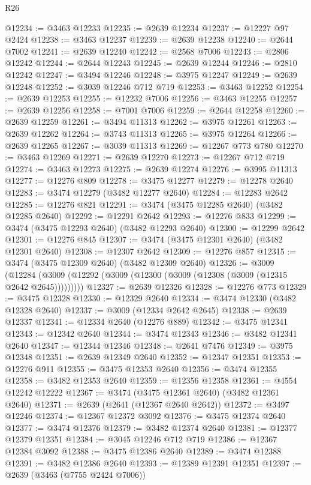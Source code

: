 \begin{lexlean}{R26}
\begin{coremodule}
@12234 := @3463 @12233
@12235 := @2639 @12234
@12237 := @12227 @97 @2424
@12238 := @3463 @12237
@12239 := @2639 @12238
@12240 := @2644 @7002
@12241 := @2639 @12240
@12242 := @2568 @7006
@12243 := @2806 @12242
@12244 := @2644 @12243
@12245 := @2639 @12244
@12246 := @2810 @12242
@12247 := @3494 @12246
@12248 := @3975 @12247
@12249 := @2639 @12248
@12252 := @3039 @12246 @712 @719
@12253 := @3463 @12252
@12254 := @2639 @12253
@12255 := @12232 @7006
@12256 := @3463 @12255
@12257 := @2639 @12256
@12258 := @7001 @7006
@12259 := @2644 @12258
@12260 := @2639 @12259
@12261 := @3494 @11313
@12262 := @3975 @12261
@12263 := @2639 @12262
@12264 := @3743 @11313
@12265 := @3975 @12264
@12266 := @2639 @12265
@12267 := @3039 @11313
@12269 := @12267 @773 @780
@12270 := @3463 @12269
@12271 := @2639 @12270
@12273 := @12267 @712 @719
@12274 := @3463 @12273
@12275 := @2639 @12274
@12276 := @3995 @11313
@12277 := @12276 @809
@12278 := @3475 @12277
@12279 := @12278 @2640
@12283 := @3474 @12279 (@3482 @12277 @2640)
@12284 := @12283 @2642
@12285 := @12276 @821
@12291 := @3474 (@3475 @12285 @2640) (@3482 @12285 @2640)
@12292 := @12291 @2642
@12293 := @12276 @833
@12299 := @3474 (@3475 @12293 @2640) (@3482 @12293 @2640)
@12300 := @12299 @2642
@12301 := @12276 @845
@12307 := @3474 (@3475 @12301 @2640) (@3482 @12301 @2640)
@12308 := @12307 @2642
@12309 := @12276 @857
@12315 := @3474 (@3475 @12309 @2640) (@3482 @12309 @2640)
@12326 := @3009
    (@12284 (@3009 (@12292 (@3009 (@12300 (@3009 (@12308 (@3009 (@12315 @2642 @2645)))))))))
@12327 := @2639 @12326
@12328 := @12276 @773
@12329 := @3475 @12328
@12330 := @12329 @2640
@12334 := @3474 @12330 (@3482 @12328 @2640)
@12337 := @3009 (@12334 @2642 @2645)
@12338 := @2639 @12337
@12341 := @12334 @2640 (@12276 @889)
@12342 := @3475 @12341
@12343 := @12342 @2640
@12344 := @3474 @12343
@12346 := @3482 @12341 @2640
@12347 := @12344 @12346
@12348 := @2641 @7476
@12349 := @3975 @12348
@12351 := @2639 @12349 @2640
@12352 := @12347 @12351
@12353 := @12276 @911
@12355 := @3475 @12353 @2640
@12356 := @3474 @12355
@12358 := @3482 @12353 @2640
@12359 := @12356 @12358
@12361 := @4554 @12242 @12222
@12367 := @3474 (@3475 @12361 @2640) (@3482 @12361 @2640)
@12371 := @2639 (@2641 (@12367 @2640 @2642))
@12372 := @3497 @12246
@12374 := @12367 @12372 @3092
@12376 := @3475 @12374 @2640
@12377 := @3474 @12376
@12379 := @3482 @12374 @2640
@12381 := @12377 @12379 @12351
@12384 := @3045 @12246 @712 @719
@12386 := @12367 @12384 @3092
@12388 := @3475 @12386 @2640
@12389 := @3474 @12388
@12391 := @3482 @12386 @2640
@12393 := @12389 @12391 @12351
@12397 := @2639 (@3463 (@7755 @2424 @7006))

\end{coremodule}
\end{lexlean}
